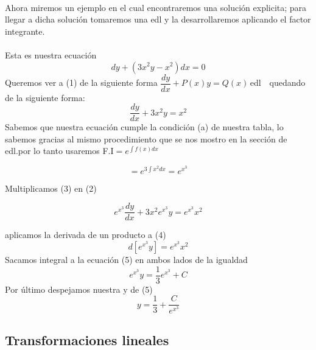 \documentclass[10pt,a4paper]{article}
\begin{document}
{{{{{{{{{{{{\,\\
Ahora miremos un ejemplo en el cual encontraremos una solución explicita; para llegar a dicha solución  tomaremos  una edl y la desarrollaremos aplicando el factor integrante.\\
\,\\
Esta es nuestra ecuación
\begin{equation}\tag{1}
dy+(3x^{2}y-x^2)dx=0
\end{equation}
Queremos ver a (1) de la siguiente forma $\dfrac{dy}{dx}+P(x)y=Q(x)$\,edl\, \, quedando de la siguiente forma:
\begin{equation}\tag{2}
\dfrac{dy}{dx}+3x^{2}y=x^2
\end{equation}
Sabemos que nuestra ecuación cumple la condición (a) de nuestra tabla, lo sabemos gracias al mismo procedimiento que se nos mostro en la sección de edl.por lo tanto usaremos F.I$=e^{\int f(x)dx}$

\begin{equation}\tag{3}
=e^{3\int x^{2}dx}=e^{x^3}
\end{equation}

Multiplicamos (3) en (2)

\begin{equation}\tag{4}
e^{x^3}\dfrac{dy}{dx}+3x^{2}e^{x^{3}}y=e^{x^{3}}x^{2}
\end{equation}

aplicamos la derivada de un producto a (4)
\begin{equation}\tag{5}
d[e^{x^{3}}y]=e^{x^{3}}x^{2}
\end{equation}
Sacamos integral a la ecuación (5) en ambos lados de la igualdad
\begin{equation}\tag{6}
e^{x^{3}}y=\dfrac{1}{3}e^{x^{3}}+C
\end{equation}
Por último despejamos nuestra y de (5)
\begin{equation*}
y=\dfrac{1}{3}+\dfrac{C}{e^{x^{3}}}
\end{equation*}  
  
  \subsection{Transformaciones lineales}
  
}}}}}}}}}}}}
\end{document}
